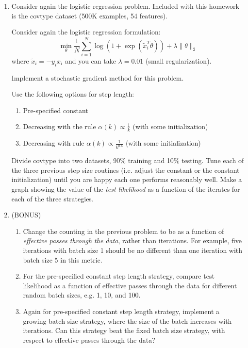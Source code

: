 \documentclass[12pt]{amsart}
\begin{document}
\begin{enumerate}
\begin{enumerate}
{\end{enumerate}




\item Consider again the logistic regression problem. 
Included with this homework is the covtype dataset (500K examples, 54 features). 

Consider again the logistic regression formulation:
\[
\min_\theta \frac{1}{N}\sum_{i=1}^N \log(1+\exp(\tilde x_i^T \theta)) + \lambda\|\theta\|_2
\]
where $\tilde x_i = -y_i x_i$ and you can take $\lambda = 0.01$ (small regularization). 

Implement a stochastic gradient method for this problem. 

Use the following options for step length:
\begin{enumerate}
\item Pre-specified constant 
\item Decreasing with the rule $\alpha(k) \propto \frac{1}{k}$ (with some initialization)
\item Decreasing with rule $\alpha(k) \propto \frac{1}{k^{0.6}}$ (with some initialization) \\
\end{enumerate}

Divide covtype into two datasets, 90\% training and 10\% testing. Tune each of the three previous step size routines 
(i.e. adjust the constant or the constant initialization) until you are happy each one performs reasonably well. 
Make a graph showing the value of the {\it test likelihood} as a function of the iterates for each of the three strategies. \\


\item (BONUS) 

\begin{enumerate}
\item Change the counting in the previous problem to be as a function of {\it effective passes through the data}, 
rather than iterations. For example, five iterations with batch size 1 should be no different than one iteration with batch size 5 in this metric. \\

\item For the pre-specified constant step length strategy, compare test likelihood as a function of effective passes through the data
for different random batch sizes, e.g. 1, 10, and 100. \\

\item Again for pre-specified constant step length strategy, implement a growing batch size strategy, where the size of the batch 
increases with iterations. Can this strategy beat the fixed batch size strategy, with respect to effective passes through the data? \\


\end{enumerate}

\end{enumerate}
\end{document}

